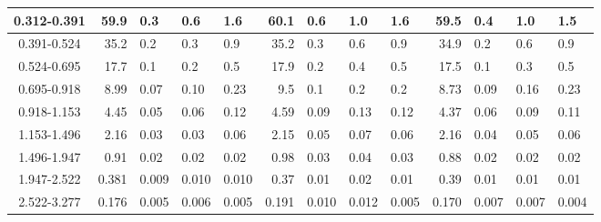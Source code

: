 \begin{table}[!htbp]
{\begin{tabular}{ | c | r@{$\pm$}l@{$\pm$}l@{$\pm$}l | r@{$\pm$}l@{$\pm$}l@{$\pm$}l | r@{$\pm$}l@{$\pm$}l@{$\pm$}l |}
0.312-0.391 & 59.9&0.3&0.6&1.6 & 60.1&0.6&1.0&1.6 & 59.5&0.4&1.0&1.5 \\ \hline
0.391-0.524 & 35.2&0.2&0.3&0.9 & 35.2&0.3&0.6&0.9 & 34.9&0.2&0.6&0.9 \\ \hline
0.524-0.695 & 17.7&0.1&0.2&0.5 & 17.9&0.2&0.4&0.5 & 17.5&0.1&0.3&0.5 \\ \hline
0.695-0.918 & 8.99&0.07&0.10&0.23 & 9.5&0.1&0.2&0.2 & 8.73&0.09&0.16&0.23 \\ \hline
0.918-1.153 & 4.45&0.05&0.06&0.12 & 4.59&0.09&0.13&0.12 & 4.37&0.06&0.09&0.11 \\ \hline
1.153-1.496 & 2.16&0.03&0.03&0.06 & 2.15&0.05&0.07&0.06 & 2.16&0.04&0.05&0.06 \\ \hline
1.496-1.947 & 0.91&0.02&0.02&0.02 & 0.98&0.03&0.04&0.03 & 0.88&0.02&0.02&0.02 \\ \hline
1.947-2.522 & 0.381&0.009&0.010&0.010 & 0.37&0.01&0.02&0.01 & 0.39&0.01&0.01&0.01 \\ \hline
2.522-3.277 & 0.176&0.005&0.006&0.005 & 0.191&0.010&0.012&0.005 & 0.170&0.007&0.007&0.004 \\ \hline
\end{tabular}}
\end{table}
\clearpage

